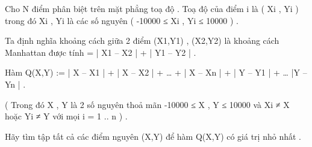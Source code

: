 Cho N điểm phân biệt trên mặt phẳng toạ độ . Toạ độ của điểm i là ( Xi , Yi ) trong đó Xi , Yi là các số nguyên ( -10000 ≤ Xi , Yi ≤ 10000 ) .   


   Ta định nghĩa khoảng cách giữa 2 điểm (X1,Y1) , (X2,Y2) là khoảng cách Manhattan được tính = | X1 – X2 | + | Y1 – Y2 | .   


   Hàm Q(X,Y) := | X – X1 | + | X – X2 | + … + | X – Xn | + | Y – Y1 | + … |Y – Yn | .   


   ( Trong đó X , Y là 2 số nguyên thoả mãn -10000 ≤ X , Y ≤ 10000 và Xi ≠ X hoặc Yi ≠ Y với mọi i = 1 .. n  ) .   


   Hãy tìm tập tất cả các điểm nguyên (X,Y) để hàm Q(X,Y) có giá trị nhỏ nhất .